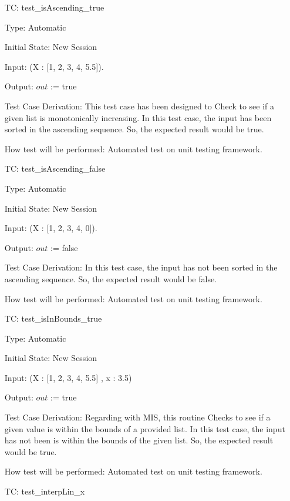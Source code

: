 \documentclass[12pt]{article}
\newcounter{utestnum} %
\begin{document}
\begin{enumerate}[label=TC\arabic*:,ref={\arabic*}]
	
	\item [TC\refstepcounter{utestnum}\theutestnum: \label{isAscendingTest}] 
	test\_isAscending\_true
	
	Type: Automatic
	
	Initial State: New Session
	
	Input: (X : [1, 2, 3, 4, 5.5]).
	
	Output: $out$ := true
	
	Test Case Derivation: This test case has been designed to Check to see if a given list is monotonically increasing. In this test case, the input has been sorted in the ascending sequence. So, the expected result would be true.
	
	How test will be performed: Automated test on unit testing framework.
	
	\item [TC\refstepcounter{utestnum}\theutestnum: \label{notisAscendingTest}] 
	test\_isAscending\_false
	
	Type: Automatic
	
	Initial State: New Session
	
	Input: (X : [1, 2, 3, 4, 0]).

	
	Output: $out$ := false
	
	Test Case Derivation: In this test case, the input has not been sorted in the ascending sequence. So, the expected result would be false.
	
	How test will be performed: Automated test on unit testing framework.
	
		\item [TC\refstepcounter{utestnum}\theutestnum: \label{isInBoundsTest}] 
	test\_isInBounds\_true
	
	Type: Automatic
	
	Initial State: New Session
	
	Input: (X : [1, 2, 3, 4, 5.5] , x : 3.5)
	
	Output: $out$ := true
	
	Test Case Derivation: Regarding with MIS, this routine Checks to see if a given value is within the bounds of a provided list. In this test case, the input has not been is within the bounds of the given list. So, the expected result would be true.
	
	How test will be performed: Automated test on unit testing framework.

	
	\item [TC\refstepcounter{utestnum}\theutestnum: \label{interpLinTest}] 
	test\_interpLin\_x
	

\end{enumerate}
\end{document}
